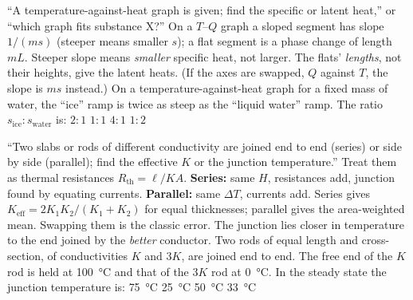 {``A temperature-against-heat graph is given; find the specific or latent heat,'' or ``which graph fits
substance X?''}
{On a $T$--$Q$ graph a sloped segment has slope $1/(ms)$ (steeper means smaller $s$); a flat segment
is a phase change of length $mL$.}
{Steeper slope means \emph{smaller} specific heat, not larger. The flats' \emph{lengths}, not their
heights, give the latent heats. (If the axes are swapped, $Q$ against $T$, the slope is $ms$ instead.)}
{On a temperature-against-heat graph for a fixed mass of water, the ``ice'' ramp is twice as steep as the
``liquid water'' ramp. The ratio $s_{\text{ice}}:s_{\text{water}}$ is:}
{$2:1$}
{$1:1$}
{$4:1$}
{$1:2$}

{``Two slabs or rods of different conductivity are joined end to end (series) or side by side
(parallel); find the effective $K$ or the junction temperature.''}
{Treat them as thermal resistances $R_{\text{th}}=\ell/KA$. \textbf{Series:} same $H$, resistances add,
junction found by equating currents. \textbf{Parallel:} same $\Delta T$, currents add.}
{Series gives $K_{\text{eff}}=2K_1K_2/(K_1{+}K_2)$ for equal thicknesses; parallel gives the
area-weighted mean. Swapping them is the classic error. The junction lies closer in temperature to the
end joined by the \emph{better} conductor.}
{Two rods of equal length and cross-section, of conductivities $K$ and $3K$, are joined end to end. The
free end of the $K$ rod is held at \SI{100}{\celsius} and that of the $3K$ rod at \SI{0}{\celsius}. In
the steady state the junction temperature is:}
{\SI{75}{\celsius}}
{\SI{25}{\celsius}}
{\SI{50}{\celsius}}
{\SI{33}{\celsius}}

